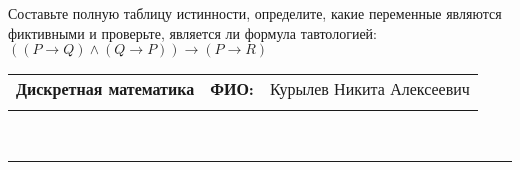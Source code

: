 \documentclass[10pt]{exam}
\newcommand{\class}{Дискретная математика}
\newcommand{\examdate}{}
\begin{document}
\begin{questions}
\begin{enumerate}[a)]
\end{enumerate}\question Составьте полную таблицу истинности, определите, какие переменные являются фиктивными и проверьте, является ли формула тавтологией:
$(( P \rightarrow Q) \land (Q \rightarrow P)) \rightarrow (P \rightarrow R)$

\end{questions}
\newpage
\begin{flushright}
\begin{tabular}{p{2.8in} r l}
\textbf{\class} & \textbf{ФИО:} &Курылев Никита Алексеевич
\\

\textbf{\examdate} &&\\
\end{tabular}\\
\end{flushright}
\rule[1ex]{\textwidth}{.1pt}
\end{document}
